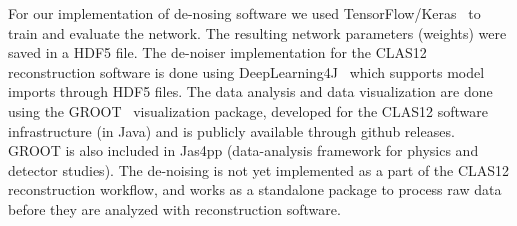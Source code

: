 For our implementation of de-nosing software we used TensorFlow/Keras~\cite{keras-website} to train 
and evaluate the network. The resulting network parameters (weights) were saved 
in a HDF5 file. The de-noiser implementation for the CLAS12 reconstruction software is 
done using DeepLearning4J~\cite{dl4j-website} which supports model imports 
through HDF5 files. 
The data analysis and data visualization are done using the GROOT~\cite{groot-github} visualization 
package, developed for the CLAS12 software infrastructure (in Java) and is publicly available 
through github releases. GROOT is also included in Jas4pp\cite{Chekanov:2020bja}  
(data-analysis framework for physics and detector studies). The de-noising is not yet implemented 
as a part of the CLAS12 reconstruction workflow, and works as a standalone package to process raw data before 
they are analyzed with reconstruction software.
